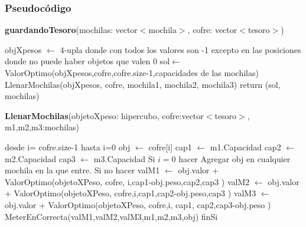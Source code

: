 \documentclass[spanish,12pt]{article}
\begin{document}
\subsubsection{Pseudocódigo}

\begin{algorithm}[H]{\textbf{guardandoTesoro}(mochilas: vector$<$mochila$>$, cofre: vector$<$tesoro$>$)}
	\begin{algorithmic}[1]
		\State objXpesos $\gets$ 4-upla donde con todos los valores son -1 excepto en las posiciones donde no puede haber objetos que valen  0 %
		\State sol$\gets$ ValorOptimo(objXpesos,cofre,cofre.size-1,capacidades de las mochilas)
		\State LlenarMochilas(objXpesos, cofre, mochila1, mochila2, mochila3)
		\State return (sol, mochilas)
	\end{algorithmic}
\end{algorithm}



\begin{algorithm}[H]{\textbf{LlenarMochilas}(objetoXpeso: hipercubo, cofre:vector$<$tesoro$>$, m1,m2,m3:mochilas)}
	\begin{algorithmic}[1]
		\State desde i= cofre.size-1 hasta i=0
			\State \quad obj $\gets$ cofre[i]
			\State \quad cap1 $\gets$ m1.Capacidad
			\State \quad cap2 $\gets$ m2.Capacidad
			\State \quad cap3 $\gets$ m3.Capacidad
			\State \quad Si $i=0$ hacer
				\State \quad \quad Agregar obj en cualquier mochila en la que entre.
			\State \quad Si no hacer
				\State \quad \quad valM1 $\gets$ obj.valor + ValorOptimo(objetoXPeso, cofre, i,cap1-obj.peso,cap2,cap3 )
				\State \quad \quad valM2 $\gets$ obj.valor + ValorOptimo(objetoXPeso, cofre,i,cap1,cap2-obj.peso,cap3 )
				\State \quad \quad valM3 $\gets$ obj.valor + ValorOptimo(objetoXPeso, cofre,i, cap1, cap2,cap3-obj.peso )
				\State \quad \quad  MeterEnCorrecta(valM1,valM2,valM3,m1,m2,m3,obj)
			\State \quad finSi

	\end{algorithmic}
\end{algorithm}



\end{document}
